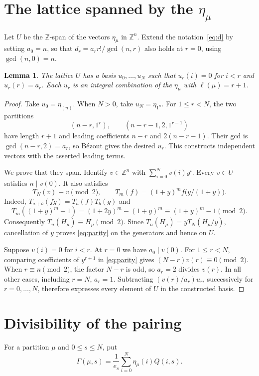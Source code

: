 \documentclass[11pt]{article}
\newtheorem{lemma}[theorem]{Lemma}
\theoremstyle{remark}
\newcommand{\Z}{\mathbb{Z}}
\begin{document}
\section{\texorpdfstring{The lattice spanned by the $\eta_\mu$}{The lattice spanned by the eta\_mu}}
Let $U$ be the $\Z$-span of the vectors $\eta_\mu$ in $\Z^n$.
Extend the notation~\eqref{eq:d} by setting $a_0=n$, so that
$d_r=a_rr!/\gcd(n,r)$ also holds at $r=0$, using $\gcd(n,0)=n$.

\begin{lemma}\label{lem:B}
The lattice $U$ has a basis $u_0,\ldots,u_N$ such that $u_r(i)=0$
for $i<r$ and $u_r(r)=a_r$. Each $u_r$ is an integral combination of
the $\eta_\mu$ with $\ell(\mu)=r+1$.
\end{lemma}
\begin{proof}
Take $u_0=\eta_{(n)}$. When $N>0$, take $u_N=\eta_{1^n}$.
For $1\leq r<N$, the two partitions
\[
 (n-r,1^r),\qquad(n-r-1,2,1^{r-1})
\]
have length $r+1$ and leading coefficients $n-r$ and $2(n-r-1)$.
Their gcd is $\gcd(n-r,2)=a_r$, so B\'ezout gives the desired $u_r$.
This constructs independent vectors with the asserted leading terms.

We prove that they span. Identify $v\in\Z^n$ with
$\sum_{i=0}^Nv(i)y^i$. Every $v\in U$ satisfies $n\mid v(0)$.
It also satisfies
\begin{equation}\label{eq:parity}
 T_N(v)\equiv v\pmod2,\qquad
 T_m(f)=(1+y)^m f\bigl(y/(1+y)\bigr).
\end{equation}
Indeed, $T_{a+b}(fg)=T_a(f)T_b(g)$ and
\[
 T_m((1+y)^m-1)=(1+2y)^m-(1+y)^m
                  \equiv(1+y)^m-1\pmod2.
\]
Consequently $T_n(H_\mu)\equiv H_\mu\pmod2$.
Since $T_n(H_\mu)=yT_N(H_\mu/y)$, cancellation of $y$ proves
\eqref{eq:parity} on the generators and hence on $U$.

Suppose $v(i)=0$ for $i<r$. At $r=0$ we have $a_0\mid v(0)$.
For $1\leq r<N$, comparing coefficients of $y^{r+1}$ in
\eqref{eq:parity} gives $(N-r)v(r)\equiv0\pmod2$.
When $r\equiv n\pmod2$, the factor $N-r$ is odd, so $a_r=2$
divides $v(r)$. In all other cases, including $r=N$, $a_r=1$.
Subtracting $(v(r)/a_r)u_r$, successively for $r=0,\ldots,N$,
therefore expresses every element of $U$ in the constructed basis.
\end{proof}

\section{Divisibility of the pairing}
For a partition $\mu$ and $0\leq s\leq N$, put
\[
 \Gamma(\mu,s)=\frac1{e_s}\sum_{i=0}^N\eta_\mu(i)Q(i,s).
\]
\end{document}
